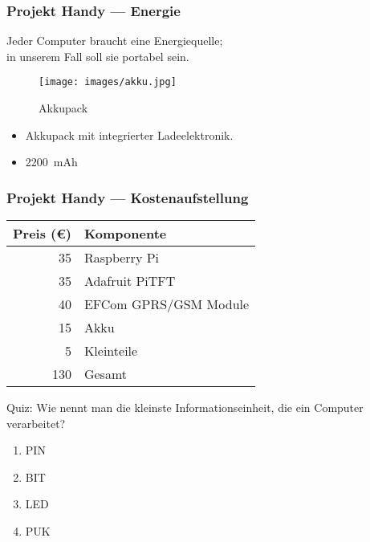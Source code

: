 \begin{frame}
	\frametitle{Projekt Handy --- Energie}
	Jeder Computer braucht eine Energiequelle; \\
	in unserem Fall soll sie portabel sein.
	\begin{figure}
		\centering
		\texttt{[image: images/akku.jpg]}
		\caption{Akkupack}
	\end{figure}
	\vspace{-0.5cm}
	\begin{itemize}
		\item Akkupack mit integrierter Ladeelektronik.
		\item \SI{2200}{mAh}
	\end{itemize}
\end{frame}

\begin{frame}
	\frametitle{Projekt Handy --- Kostenaufstellung}
	\begin{center}
		\begin{tabular}{rl} \toprule
			Preis (\euro) & Komponente \\ \midrule
			35 & Raspberry Pi\\
			35 & Adafruit PiTFT\\
			40 & EFCom GPRS/GSM Module\\
			15 & Akku\\
			5 & Kleinteile\\\cmidrule(lr){1-2}
			130 & Gesamt\\
			\bottomrule
		\end{tabular}
	\end{center}
\end{frame}


\begin{frame}
    \centering
	\begin{block}{Quiz:}
		Wie nennt man die kleinste Informationseinheit, die ein Computer
		verarbeitet?
		\begin{enumerate}
			\item PIN
			\item BIT
			\item LED
			\item PUK
		\end{enumerate}
	\end{block}

	\medskip

\end{frame}

